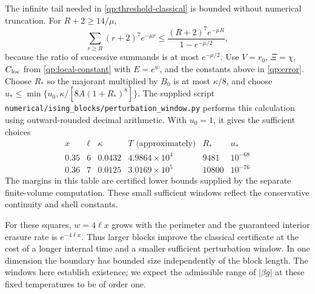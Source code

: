 The infinite tail needed in \eqref{qp:threshold-classical} is bounded
without numerical truncation. For $R+2\ge14/\mu$,
\begin{equation}
 \sum_{r\ge R}(r+2)^7e^{-\mu r}
 \le\frac{(R+2)^7e^{-\mu R}}{1-e^{-\mu/2}},
 \label{app:ising-tail-majorant}
\end{equation}
because the ratio of successive summands is at most $e^{-\mu/2}$.
Use $V=r_0$, $\Xi=\chi$, $C_{\rm loc}$ from
\eqref{qp:local-constant} with $E=e^w$, and the constants above in
\eqref{qp:error}. Choose $R_*$ so the majorant multiplied by $B_0$
is at most $\kappa/8$, and choose
$u_*\le\min\{u_0,\kappa/[8A(1+R_*)^8]\}$.
The supplied script \texttt{numerical/ising\_blocks/perturbation\_window.py}
performs this calculation using outward-rounded decimal arithmetic.
With $u_0=1$, it gives the sufficient choices
\[
 \begin{array}{c|c|c|c|c|c}
  x&\ell&\kappa&T\text{ (approximately)}&R_*&u_*\\\hline
  0.35&6&0.0432&4.9864\times10^4&9481&10^{-68}\\
  0.36&7&0.0125&3.0169\times10^5&10800&10^{-76}
 \end{array}
\]
The margins in this table are certified lower bounds supplied by the
separate finite-volume computation. These small sufficient windows
reflect the conservative continuity and shell constants.

\begin{remark}
For these squares, $w=4\ell x$ grows with the perimeter and the
guaranteed interior erasure rate is $e^{-4\ell x}$. Thus larger
blocks improve the classical certificate at the cost of a longer
internal time and a smaller sufficient perturbation window.
In one dimension the boundary has bounded size independently of
the block length. The windows here establish existence; we expect
the admissible range of $|\beta g|$ at these fixed temperatures
to be of order one.
\end{remark}
